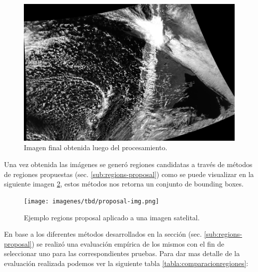 \begin{figure}[H] \centering
  \includegraphics[scale=0.4,keepaspectratio=true,clip=true]{imagenes/tbd/pre-img.png}
  \caption{Imagen final obtenida luego del procesamiento.}\label{Fig:img-final}
\end{figure}


Una vez obtenida las imágenes se generó regiones candidatas a través de métodos de regiones propuestas (sec. \ref{sub:regions-proposal}) como se puede visualizar en la siguiente imagen \ref{Fig:rp-ejemplo}, estos métodos nos retorna  un conjunto de bounding boxes.

\begin{figure}[H] \centering
  \texttt{[image: imagenes/tbd/proposal-img.png]}
  \caption{Ejemplo regions proposal aplicado a una imagen satelital.}\label{Fig:rp-ejemplo}
\end{figure}

En base a los diferentes métodos desarrollados en la sección (sec. \ref{sub:regions-proposal}) se realizó una evaluación empírica de los mismos con el fin de seleccionar uno para las correspondientes pruebas. Para dar mas detalle de la evaluación realizada podemos ver la siguiente tabla \ref{tabla:comparacionregiones}:

